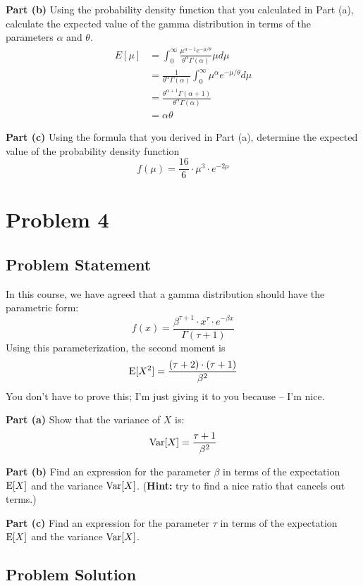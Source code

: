 \documentclass[12pt]{article}
\theoremstyle{definition}
\begin{document}
\noindent
{\bf Part (b)} Using the probability density function that you calculated in Part (a), calculate the expected value of the gamma distribution in terms of the parameters $\alpha$ and $\theta$.
\begin{align*}
E[\mu] &= \int_0^\infty \frac{\mu^{\alpha - 1} e^{-\mu/\theta}}{\theta^\alpha\Gamma(\alpha)}  \mu d\mu\\
&= \frac{1}{\theta^\alpha\Gamma(\alpha)} \int_0^\infty \mu^\alpha e^{-\mu/\theta} d\mu\\
&= \frac{\theta^{\alpha + 1}\Gamma(\alpha + 1)}{\theta^\alpha\Gamma(\alpha)}\\
&= \alpha\theta
\end{align*}

\noindent
{\bf Part (c)} Using the formula that you derived in Part (a), determine the expected value of the probability density function
$$
f(\mu) = \frac{16}{6} \cdot \mu^3 \cdot e^{-2\mu}
$$


\newpage
\section*{Problem 4}

\subsection*{Problem Statement}

In this course, we have agreed that a gamma distribution should have the parametric form:
$$
f(x) = \frac{ \beta^{\tau + 1} \cdot x^\tau \cdot e^{-\beta x} }{\Gamma( \tau + 1)}
$$
Using this parameterization, the second moment is
$$
\hbox{E}[X^2] = \frac{(\tau + 2) \cdot (\tau + 1)}{\beta^2}
$$
You don't have to prove this; I'm just giving it to you because -- I'm nice.

\bigskip
\noindent
{\bf Part (a)} Show that the variance of $X$ is:
$$
\hbox{Var}[X] = \frac{\tau + 1}{\beta^2}
$$

\bigskip
\noindent
{\bf Part (b)} Find an expression for the parameter $\beta$ in terms of the expectation $\hbox{E}[X]$ and the variance $\hbox{Var}[X]$. ({\bf Hint:} try to find a nice ratio that cancels out terms.)


\bigskip
\noindent
{\bf Part (c)} Find an expression for the parameter $\tau$ in terms of the expectation $\hbox{E}[X]$ and the variance $\hbox{Var}[X]$.


\subsection*{Problem Solution}
\end{document}
